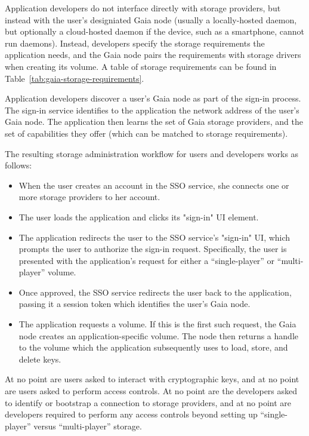 Application developers do not interface directly with storage providers, but
instead with the user's designiated Gaia node (usually a locally-hosted daemon,
but optionally a cloud-hosted daemon if the device, such as a smartphone, cannot
run daemons).  Instead, developers specify the storage requirements the
application needs, and the Gaia node pairs the requirements with storage drivers
when creating its volume.  A table of storage requirements can be found in
Table~\ref{tab:gaia-storage-requirements}.


Application developers discover a user's Gaia node as part of the sign-in
process.  The sign-in service identifies to the application the network address
of the user's Gaia node.  The application then learns the set of Gaia storage
providers, and the set of capabilities they offer (which can be matched to
storage requirements).

The resulting storage administration workflow for users and developers works as
follows:
\begin{itemize}
   \item When the user creates an account in the SSO service, she connects one
      or more storage providers to her account.
   \item The user loads the application and clicks its "sign-in" UI element.
   \item The application redirects the user to the SSO service's "sign-in" UI,
      which prompts the user to authorize the sign-in request.  Specifically,
      the user is presented with the application's request for either a
      ``single-player'' or ``multi-player'' volume.
   \item Once approved, the SSO service redirects the user back to the
      application, passing it a session token which identifies the user's Gaia
      node.
   \item The application requests a volume.  If this is the first such request,
      the Gaia node creates an application-specific volume.  The node then
      returns a handle to the volume which the application subsequently uses to
      load, store, and delete keys.
\end{itemize}

At no point are users asked to interact with cryptographic keys, and at no point
are users asked to perform access controls.  At no point are the developers
asked to identify or bootstrap a connection to storage providers, and at no
point are developers required to perform any access controls beyond setting up
``single-player'' versus ``multi-player'' storage.

